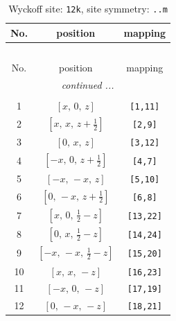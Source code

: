 \documentclass[fleqn,8pt]{jsarticle}
\begin{document}
\begin{longtable}{ccc}
\caption{Wyckoff site: {\tt 12k}, site symmetry: {\tt ..m}}
 \\
 \hline \hline
No. & position & mapping \\ \hline \endfirsthead

\multicolumn{2}{l}{\tablename\ \thetable{}} \\
 \hline \hline
No. & position & mapping \\ \hline \endhead

 \hline \hline
\multicolumn{2}{r}{\footnotesize\it continued ...} \\ \endfoot

 \hline \hline
\multicolumn{2}{r}{} \\ \endlastfoot

1 & $\left[ x,\, 0,\, z \right]$ & {\tt [1,11]} \\ \hline
2 & $\left[ x,\, x,\, z + \frac{1}{2} \right]$ & {\tt [2,9]} \\ \hline
3 & $\left[ 0,\, x,\, z \right]$ & {\tt [3,12]} \\ \hline
4 & $\left[ - x,\, 0,\, z + \frac{1}{2} \right]$ & {\tt [4,7]} \\ \hline
5 & $\left[ - x,\, - x,\, z \right]$ & {\tt [5,10]} \\ \hline
6 & $\left[ 0,\, - x,\, z + \frac{1}{2} \right]$ & {\tt [6,8]} \\ \hline
7 & $\left[ x,\, 0,\, \frac{1}{2} - z \right]$ & {\tt [13,22]} \\ \hline
8 & $\left[ 0,\, x,\, \frac{1}{2} - z \right]$ & {\tt [14,24]} \\ \hline
9 & $\left[ - x,\, - x,\, \frac{1}{2} - z \right]$ & {\tt [15,20]} \\ \hline
10 & $\left[ x,\, x,\, - z \right]$ & {\tt [16,23]} \\ \hline
11 & $\left[ - x,\, 0,\, - z \right]$ & {\tt [17,19]} \\ \hline
12 & $\left[ 0,\, - x,\, - z \right]$ & {\tt [18,21]} \\
\end{longtable}
\renewcommand{\arraystretch}{1.2}
\end{document}
